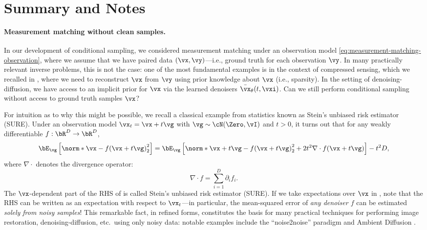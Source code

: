 \documentclass[../../book-main.tex]{subfiles}
\begin{document}
\section{Summary and Notes}
\paragraph{Measurement matching without clean samples.} In our development of
conditional sampling, we considered measurement matching under an observation
model \eqref{eq:measurement-matching-observation}, where we assume that we have
paired data $(\vx, \vy)$---i.e., ground truth for each observation $\vy$.
In many practically relevant inverse problems, this is not the case: one of the
most fundamental examples is in the context of compressed sensing, which we
recalled in , where we need to reconstruct
$\vx$ from $\vy$
using prior knowledge about $\vx$ (i.e., sparsity).
In the setting of denoising-diffusion, we have access to an implicit prior for
$\vx$ via the learned denoisers $\bar{\vx}_{\theta}(t, \vxi)$. Can we
still perform
conditional sampling without access to ground truth samples $\vx$?

For intuition as to why this might be possible, we recall a classical example
from statistics known as Stein's unbiased risk estimator (SURE).
Under an observation model $\vx_t = \vx + t \vg$ with $\vg \sim \cN(\Zero,
\vI)$ and $t>0$, it turns out that for any weakly differentiable $f :
\bR^D \to \bR^D$,
\begin{equation}\label{eq:sure-risk}
    \bE_{\vg}\left[
        \norm*{\vx - f(\vx + t \vg)}_2^2
    \right]
    =
    \bE_{\vg}\left[
        \norm*{\vx+t\vg - f(\vx + t \vg)}_2^2
        + 2t^2 \nabla \cdot f(\vx + t\vg)
    \right]
    - t^2 D,
\end{equation}
where $\nabla \cdot$ denotes the divergence operator:
\begin{equation*}
    \nabla \cdot f = \sum_{i=1}^D \partial_i f_i.
\end{equation*}
The $\vx$-dependent part of the RHS of  is called
Stein's unbiased risk
estimator (SURE). If we take expectations over $\vx$ in ,
note that the RHS can be written as an expectation with respect to $\vx_t$---in
particular, the mean-squared error of \textit{any denoiser $f$} can be estimated
\textit{solely from noisy samples}!
This remarkable fact, in refined forms, constitutes the basis for many practical
techniques for performing image restoration, denoising-diffusion, etc.\ using
only noisy data: notable examples include the ``noise2noise'' paradigm
\cite{pmlr-v80-lehtinen18a}
and Ambient Diffusion \cite{daras2023ambient}.
\end{document}
